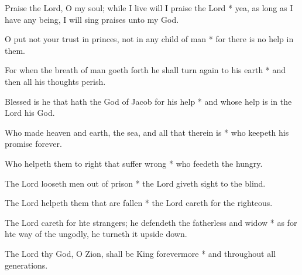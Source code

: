 Praise the Lord, O my soul; while I live will I praise the Lord * yea, as long as I have any being, I will sing praises unto my God.

O put not your trust in princes, not in any child of man * for there is no help in them.
	
For when the breath of man goeth forth he shall turn again to his earth * and then all his thoughts perish.
	
Blessed is he that hath the God of Jacob for his help * and whose help is in the Lord his God.
	
Who made heaven and earth, the sea, and all that therein is * who keepeth his promise forever.
	
Who helpeth them to right that suffer wrong * who feedeth the hungry.
	
The Lord looseth men out of prison * the Lord giveth sight to the blind.
	
The Lord helpeth them that are fallen * the Lord careth for the righteous.
	
The Lord careth for hte strangers; he defendeth the fatherless and widow * as for hte way of the ungodly, he turneth it upside down.
	
The Lord thy God, O Zion, shall be King forevermore * and throughout all generations.
